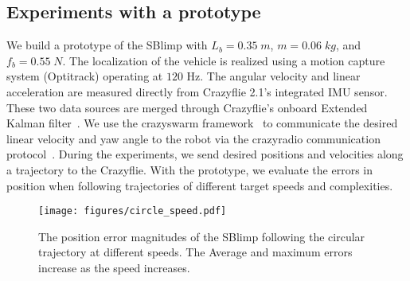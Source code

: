 \documentclass[conference]{ieeeconf}
\newcommand{\david}[1]{{\color{blue}#1}}
\begin{document}
\subsection{Experiments with a prototype}
We build a prototype of the SBlimp with $L_b = 0.35\; m$, $m = 0.06\; kg$, and $f_b = 0.55\; N$.
The localization of the vehicle is realized using a motion capture system (Optitrack) operating at $120$ Hz. The angular velocity and linear acceleration are measured directly from Crazyflie 2.1's integrated IMU sensor. These two data sources are merged through Crazyflie's onboard Extended Kalman filter~\cite{mueller2015fusing}. We use the crazyswarm framework~\cite{crazyswarm} to communicate the desired linear velocity and yaw angle to the robot via the crazyradio communication protocol~\cite{crazyflieROS}. During the experiments, we send desired positions and velocities along a trajectory to the Crazyflie. With the prototype, we evaluate the errors in position when following trajectories of different target speeds and complexities.

\begin{figure}[t]
    \centering
    \texttt{[image: figures/circle\_speed.pdf]}
    \caption{The position error magnitudes of the SBlimp following the circular trajectory at different speeds. 
    The Average and maximum errors increase as the speed increases.}
    \label{fig:circle} 
    \vspace{-1em}
\end{figure}
\end{document}
